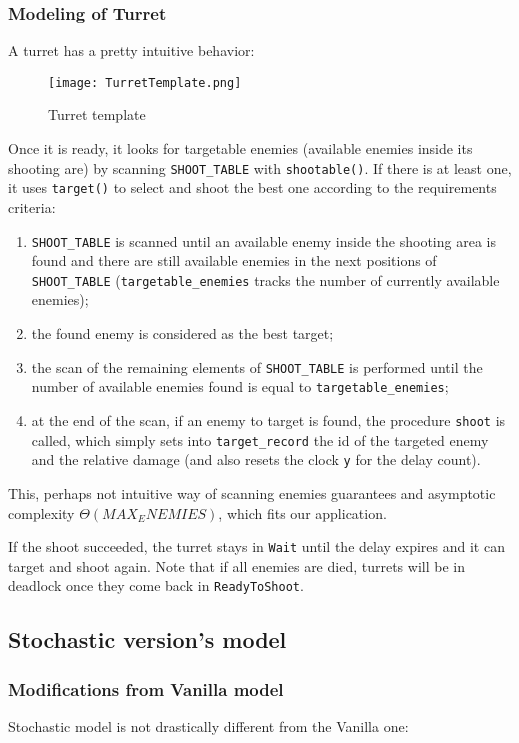\documentclass[
10pt, %
a4paper, %
oneside, %
headinclude,footinclude, %
BCOR5mm, %
]{scrartcl}
\begin{document}
	\subsubsection{Modeling of Turret}
	A turret has a pretty intuitive behavior:
	
	\begin{figure}[h!]
		\centering
		\texttt{[image: TurretTemplate.png]}
		\caption{Turret template}
	\end{figure}
	
	Once it is ready, it looks for targetable enemies (available enemies inside its shooting are) by scanning \texttt{SHOOT\_TABLE} with \texttt{shootable()}. If there is at least one, it uses \texttt{target()} to select and shoot the best one according to the requirements criteria:
	\begin{enumerate}
		\item \texttt{SHOOT\_TABLE} is scanned until an available enemy inside the shooting area is found and there are still available enemies in the next positions of \texttt{SHOOT\_TABLE} (\texttt{targetable\_enemies} tracks the number of currently available enemies);
		\item the found enemy is considered as the best target;
		\item the scan of the remaining elements of \texttt{SHOOT\_TABLE} is performed until the number of available enemies found is equal to \texttt{targetable\_enemies};
		\item at the end of the scan, if an enemy to target is found, the procedure \texttt{shoot} is called, which simply sets into \texttt{target\_record} the id of the targeted enemy and the relative damage (and also resets the clock \texttt{y} for the delay count). 
	\end{enumerate}
	This, perhaps not intuitive way of scanning enemies guarantees and asymptotic complexity $\Theta(MAX_ENEMIES)$, which fits our application.
	
	If the shoot succeeded, the turret stays in \texttt{Wait} until the delay expires and it can target and shoot again. Note that if all enemies are died, turrets will be in deadlock once they come back in \texttt{ReadyToShoot}.
	
	\subsection{Stochastic version's model}
	\subsubsection{Modifications from Vanilla model}
	Stochastic model is not drastically different from the Vanilla one:
	
\end{document}
